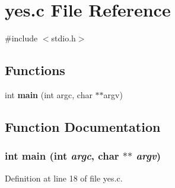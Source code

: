 \section{yes.c File Reference}
\label{yes_8c}
{\ttfamily \#include $<$stdio.h$>$}\par
\subsection*{Functions}
\begin{DoxyCompactItemize}
\item 
int {\bf main} (int argc, char $\ast$$\ast$argv)
\end{DoxyCompactItemize}


\subsection{Function Documentation}
\subsubsection[{main}]{\setlength{\rightskip}{0pt plus 5cm}int main (int {\em argc}, \/  char $\ast$$\ast$ {\em argv})}\label{yes_8c_a3c04138a5bfe5d72780bb7e82a18e627}


Definition at line 18 of file yes.c.

